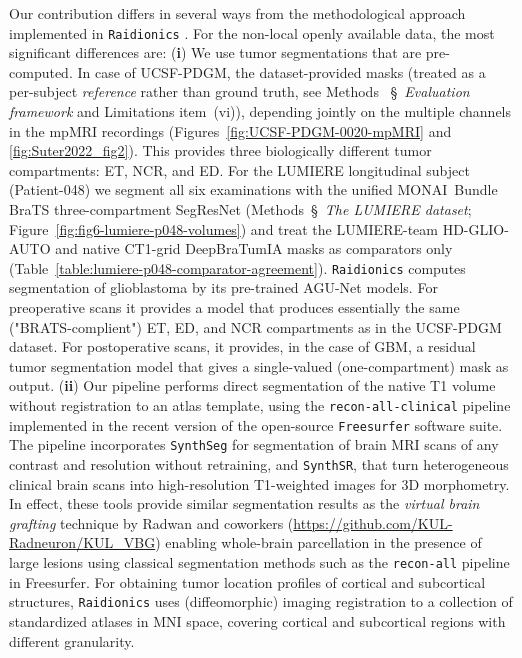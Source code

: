 \documentclass[a4paper,11pt,leqno]{article}
\begin{document}
Our contribution differs in several ways from the methodological
approach implemented in \texttt{Raidionics} \cite{Bouget2023a}. For the non-local openly available data, the most significant differences
are: (\textbf{i}) We use tumor segmentations that are pre-computed. In case of UCSF-PDGM, the dataset-provided masks (treated as a
per-subject \emph{reference} rather than ground truth, see Methods
~\S~\emph{Evaluation framework} and Limitations item~(vi)), depending jointly on the multiple channels
in the mpMRI recordings (Figures~\ref{fig:UCSF-PDGM-0020-mpMRI} and \ref{fig:Suter2022_fig2}). This provides three biologically different
tumor compartments: ET, NCR, and ED. For the LUMIERE
longitudinal subject (Patient-048) we segment all six examinations
with the unified MONAI~Bundle BraTS three-compartment SegResNet
(Methods~\S~\emph{The LUMIERE dataset};
Figure~\ref{fig:fig6-lumiere-p048-volumes}) and treat the
LUMIERE-team HD-GLIO-AUTO and native CT1-grid DeepBraTumIA masks as
comparators only
(Table~\ref{table:lumiere-p048-comparator-agreement}).
\texttt{Raidionics} computes segmentation of glioblastoma by its pre-trained AGU-Net models.
For preoperative scans it provides a model that produces essentially the same ("BRATS-complient") ET, ED, and NCR compartments as in the UCSF-PDGM dataset.
For postoperative scans, it provides, in the case of GBM, a residual tumor segmentation model that gives a single-valued (one-compartment) mask as output.
(\textbf{ii}) Our pipeline performs direct
segmentation of the native T1 volume without registration to an atlas
template, using the \texttt{recon-all-clinical} pipeline implemented in the
recent version of the open-source \texttt{Freesurfer} software suite. The
pipeline incorporates \texttt{SynthSeg} for segmentation of brain MRI scans of
any contrast and resolution without retraining, and \texttt{SynthSR}, that turn
heterogeneous clinical brain scans into high-resolution T1-weighted
images for 3D morphometry. In effect, these tools provide similar
segmentation results as the \emph{virtual brain grafting} technique by
Radwan and coworkers \cite{Radwan2021}  %
({\small \url{https://github.com/KUL-Radneuron/KUL_VBG}}) enabling whole-brain
parcellation in the presence of large lesions using classical segmentation methods such as the \texttt{recon-all} pipeline in Freesurfer. For obtaining tumor location profiles of cortical and subcortical structures, \texttt{Raidionics} uses (diffeomorphic) imaging registration to a collection of standardized atlases in MNI space, covering cortical and subcortical regions with
different granularity.
\end{document}
